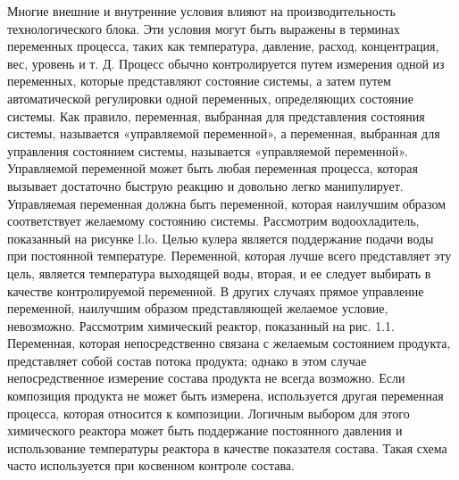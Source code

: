 \documentclass[aps,
12pt,
final,
oneside,
onecolumn,
musixtex, 
superscriptaddress,
centertags]{article}
\begin{document}
Многие внешние и внутренние условия влияют на производительность технологического блока. Эти условия могут быть выражены в терминах переменных процесса, таких как температура, давление, расход, концентрация, вес, уровень и т. Д. Процесс обычно контролируется путем измерения одной из переменных, которые представляют состояние системы, а затем путем автоматической регулировки одной переменных, определяющих состояние системы. Как правило, переменная, выбранная для представления состояния системы, называется «управляемой переменной», а переменная, выбранная для управления состоянием системы, называется «управляемой переменной».\\
Управляемой переменной может быть любая переменная процесса, которая вызывает достаточно быструю реакцию и довольно легко манипулирует. Управляемая переменная должна быть переменной, которая наилучшим образом соответствует желаемому состоянию системы. Рассмотрим водоохладитель, показанный на рисунке l.lo. Целью кулера является поддержание подачи воды при постоянной температуре. Переменной, которая лучше всего представляет эту цель, является температура выходящей воды, вторая, и ее следует выбирать в качестве контролируемой переменной. В других случаях прямое управление переменной, наилучшим образом представляющей желаемое условие, невозможно. Рассмотрим химический реактор, показанный на рис. 1.1. Переменная, которая непосредственно связана с желаемым состоянием продукта, представляет собой состав потока продукта; однако в этом случае непосредственное измерение состава продукта не всегда возможно. Если композиция продукта не может быть измерена, используется другая переменная процесса, которая относится к композиции. Логичным выбором для этого химического реактора может быть поддержание постоянного давления и использование температуры реактора в качестве показателя состава. Такая схема часто используется при косвенном контроле состава.
\end{document}
